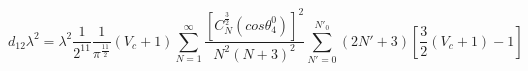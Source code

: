 \begin{equation}
d_{12}\lambda^2 
= \lambda^2\frac{1}{2^{11}}\frac{1}{\pi^\frac{11}{2}}(V_c + 1)\sum_{N=1}^{\infty}\frac{[C_N^{\frac{3}{2}}(cos{\theta_4^0})]^2}{N^2(N + 3)^2}\sum_{N'=0}^{N'_0}(2N' + 3)[\frac{3}{2}(V_c + 1) - 1]
\end{equation}

